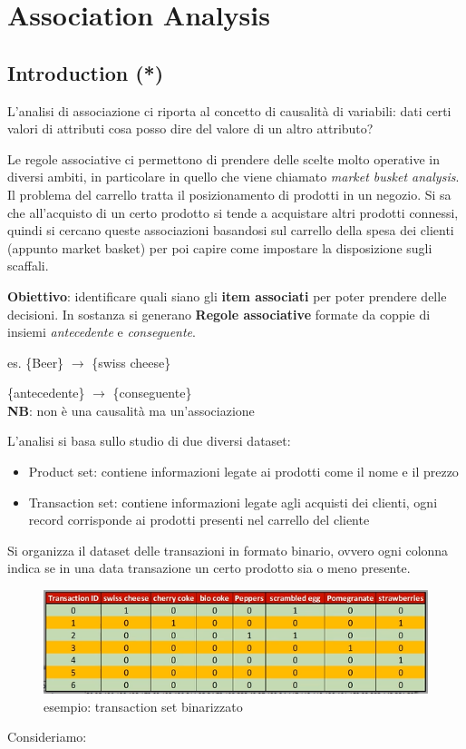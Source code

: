 

\section{Association Analysis}
\subsection{Introduction (*)}

L'analisi di associazione ci riporta al concetto di causalit\`a di variabili: dati certi valori di attributi cosa posso dire del valore di un altro attributo?

Le regole associative ci permettono di prendere delle scelte molto operative in diversi ambiti, in particolare in quello che viene chiamato \textit{market busket analysis}. 
Il problema del carrello tratta il posizionamento di prodotti in un negozio. Si sa che all'acquisto di un certo prodotto si tende a acquistare altri prodotti connessi, quindi si cercano queste associazioni basandosi sul carrello della spesa dei clienti (appunto market basket) per poi capire come impostare la disposizione sugli scaffali.

\textbf{Obiettivo}: identificare quali siano gli \textbf{item associati} per poter prendere delle decisioni. In sostanza si generano \textbf{Regole associative} formate da coppie di insiemi \textit{antecedente} e \textit{conseguente}.

es. \{Beer\} $\rightarrow$ \{swiss cheese\} 

\quad \{antecedente\} $\rightarrow$ \{conseguente\}\\
\textbf{NB}: non \`e una causalit\`a ma un'associazione

L'analisi si basa sullo studio di due diversi dataset:
\begin{itemize}
	\item Product set: contiene informazioni legate ai prodotti come il nome e il prezzo
	\item Transaction set: contiene informazioni legate agli acquisti dei clienti, ogni record corrisponde ai prodotti presenti nel carrello del cliente
\end{itemize}

Si organizza il dataset delle transazioni in formato binario, ovvero ogni colonna indica se in una data transazione un certo prodotto sia o meno presente.

\begin{figure}[H]
	\centering
	\includegraphics[height=0.25 \linewidth]{association/pict/transaction_set_bin.png}
	\caption{esempio: transaction set binarizzato}
\end{figure}
\clearpage
\noindent
Consideriamo:

